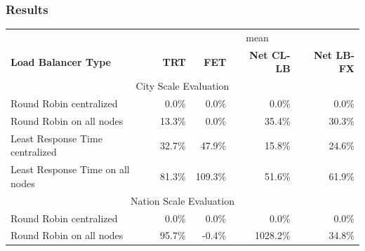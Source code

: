 \documentclass[draft,final]{vutinfth} %
\begin{document}
\subsubsection{Results}

\begin{table}[]
\begin{tabular}{lrrrr}
\hline
                                 & \multicolumn{4}{c}{mean}                                                                                                                              \\
\textbf{Load Balancer Type}      & \multicolumn{1}{r}{\textbf{TRT}} & \multicolumn{1}{r}{\textbf{FET}} & \multicolumn{1}{r}{\textbf{Net CL-LB}} & \multicolumn{1}{r}{\textbf{Net LB-FX}} \\ \hline
\multicolumn{5}{c}{City Scale Evaluation}                                                                                                                                                \\ \hline
Round Robin centralized          & 0.0\%                            & 0.0\%                            & 0.0\%                                  & 0.0\%                                  \\
Round Robin on all nodes         & 13.3\%                           & 0.0\%                            & 35.4\%                                 & 30.3\%                                 \\
Least Response Time centralized  & 32.7\%                           & 47.9\%                           & 15.8\%                                 & 24.6\%                                 \\
Least Response Time on all nodes & 81.3\%                           & 109.3\%                          & 51.6\%                                 & 61.9\%                                 \\ \hline
\multicolumn{5}{c}{Nation Scale Evaluation}                                                                                                                                              \\ \hline
Round Robin centralized          & 0.0\%                            & 0.0\%                            & 0.0\%                                  & 0.0\%                                  \\
Round Robin on all nodes         & 95.7\%                           & -0.4\%                           & 1028.2\%                               & 34.8\%                                 \\

\end{tabular}
\end{table}
\end{document}
